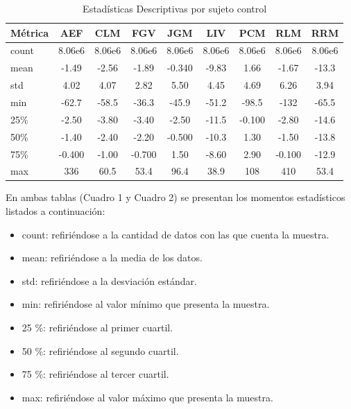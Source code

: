 \begin{table}[h]
\centering
\caption{Estadísticas Descriptivas por sujeto control}
\label{tab:estadisticas3}
\begin{tabular}{lSSSSSSSS}
\toprule
\textbf{Métrica} & \textbf{AEF} & \textbf{CLM} & \textbf{FGV} & \textbf{JGM} & \textbf{LIV} & \textbf{PCM} & \textbf{RLM} & \textbf{RRM} \\
\midrule
count & 8.06e6 & 8.06e6 & 8.06e6 & 8.06e6 & 8.06e6 & 8.06e6 & 8.06e6 & 8.06e6 \\
mean  & -1.49 & -2.56 & -1.89 & -0.340 & -9.83 & 1.66 & -1.67 & -13.3 \\
std   & 4.02  & 4.07  & 2.82  & 5.50   & 4.45  & 4.69 & 6.26  & 3.94  \\
min   & -62.7 & -58.5 & -36.3 & -45.9  & -51.2 & -98.5 & -132  & -65.5 \\
25\%  & -2.50 & -3.80 & -3.40 & -2.50  & -11.5 & -0.100 & -2.80 & -14.6 \\
50\%  & -1.40 & -2.40 & -2.20 & -0.500 & -10.3 & 1.30  & -1.50 & -13.8 \\
75\%  & -0.400 & -1.00 & -0.700 & 1.50   & -8.60 & 2.90  & -0.100 & -12.9 \\
max   & 336   & 60.5  & 53.4  & 96.4   & 38.9  & 108   & 410   & 53.4  \\
\bottomrule
\end{tabular}
\end{table}

En ambas tablas (Cuadro 1 y Cuadro 2) se presentan los momentos estadísticos listados a
continuación:
\begin{itemize}
  \item count: refiriéndose a la cantidad de datos con las que cuenta la muestra. 
  \item mean: refiriéndose a la media de los datos.
   \item std: refiriéndose a la desviación estándar.
   \item min: refiriéndose al valor mínimo que presenta la muestra.
   \item 25 \%: refiriéndose al primer cuartil.
   \item 50 \%: refiriéndose al segundo cuartil.
   \item 75 \%: refiriéndose al tercer cuartil.
   \item max: refiriéndose al valor máximo que presenta la muestra.
\end{itemize}


